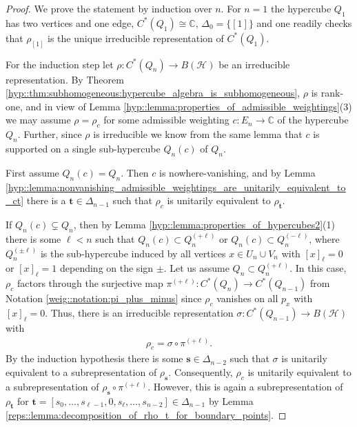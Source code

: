\documentclass[a4paper]{amsart}
\newcommand{\C}{\mathbb{C}}
\begin{document}
\begin{proof}
    We prove the statement by induction over $n$. For $n=1$ the hypercube $Q_1$ has two vertices and one edge, $C^\ast(Q_1) \cong \C$, $\Delta_0 = \{[1]\}$ and one readily checks that $\rho_{[1]}$ is the unique irreducible representation of $C^\ast(Q_1)$.

    For the induction step let $\rho: C^\ast(Q_n) \to B(\mathcal{H})$ be an irreducible representation. By Theorem \ref{hyp::thm:subhomogeneous:hypercube_algebra_is_subhomogeneous}, $\rho$ is rank-one, and in view of Lemma \ref{hyp::lemma:properties_of_admissible_weightings}(3) we may assume $\rho = \rho_c$ for some admissible weighting $c: E_n \to \C$ of the hypercube $Q_n$. Further, since $\rho$ is irreducible we know from the same lemma that $c$ is supported on a single sub-hypercube $Q_n(c)$ of $Q_n$.

    First assume $Q_n(c) = Q_n$. Then $c$ is nowhere-vanishing, and by Lemma \ref{hyp::lemma:nonvanishing_admissible_weightings_are_unitarily_equivalent_to_ct} there is a $\mathbf{t} \in \Delta_{n-1}$ such that $\rho_c$ is unitarily equivalent to $\rho_\mathbf{t}$.

    If $Q_n(c) \subsetneq Q_n$, then by Lemma \ref{hyp::lemma:properties_of_hypercubes2}(1) there is some $\ell < n$ such that $Q_n(c) \subset Q_n^{(+\ell)}$ or $Q_n(c) \subset Q_n^{(-\ell)}$, where $Q_n^{(\pm \ell)}$ is the sub-hypercube induced by all vertices $x \in U_n \cup V_n$ with $[x]_\ell = 0$ or $[x]_\ell = 1$ depending on the sign $\pm$. Let us assume $Q_n \subset Q_n^{(+\ell)}$. In this case, $\rho_c$ factors through the surjective map $\pi^{(+\ell)}: C^\ast(Q_n) \to C^\ast(Q_{n-1})$ from Notation \ref{weig::notation:pi_plus_minus} since $\rho_c$ vanishes on all $p_x$ with $[x]_\ell = 0$. Thus, there is an irreducible representation $\sigma: C^\ast(Q_{n-1}) \to B(\mathcal{H})$ with
    \begin{align*}
        \rho_c = \sigma \circ \pi^{(+\ell)}.
    \end{align*}
    By the induction hypothesis there is some $\mathbf{s} \in \Delta_{n-2}$ such that $\sigma$ is unitarily equivalent to a subrepresentation of $\rho_\mathbf{s}$. Consequently, $\rho_c$ is unitarily equivalent to a subrepresentation of $\rho_\mathbf{s} \circ \pi^{(+\ell)}$. However, this is again a subrepresentation of $\rho_\mathbf{t}$ for $\mathbf{t} = [s_0, \dots, s_{\ell-1}, 0, s_\ell, \dots, s_{n-2}] \in \Delta_{n-1}$ by Lemma \ref{reps::lemma:decomposition_of_rho_t_for_boundary_points}.
\end{proof}
\end{document}
